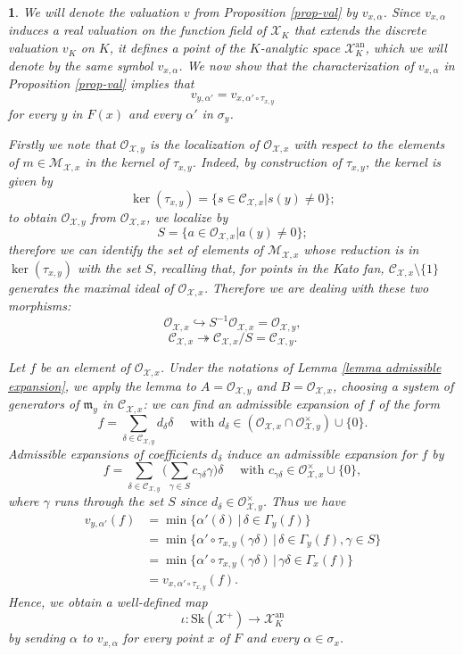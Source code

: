 \documentclass{amsart}%
\numberwithin{equation}{subsection}
\theoremstyle{plain2}
\theoremstyle{definition2}
\theoremstyle{stepstyle}
\theoremstyle{point}
\theoremstyle{subpoint}
\newtheorem{subpoint}[equation]{}%
\newcommand{\spa}[1]{\begin{subpoint}#1\end{subpoint}}           %
\newcommand{\cX}{\ensuremath{\mathscr{X}}}
\newcommand{\caM}{\ensuremath{\mathcal{M}}}
\newcommand{\caC}{\ensuremath{\mathcal{C}}}
\newcommand{\caO}{\ensuremath{\mathcal{O}}}
\newcommand{\an}{\mathrm{an}}
\newcommand{\Sk}{\mathrm{Sk}}
\begin{document}
\spa{ We will denote the valuation $v$ from Proposition
\ref{prop-val} by $v_{x,\alpha}$. Since $v_{x,\alpha}$ induces a real valuation on the function field of $\cX_K$ that extends the discrete valuation $v_K$ on $K$, it defines a point of the $K$-analytic space $\cX_K^\an$, which we will denote by the same symbol $v_{x,\alpha}$. We now show that the characterization of $v_{x,\alpha}$ in Proposition \ref{prop-val} implies that $$v_{y,\alpha'}=v_{x,\alpha'\circ \tau_{x,y}}$$ for every $y$ in $F(x)$ and every $\alpha'$ in $\sigma_y$.

Firstly we note that  $\mathcal{O}_{\cX,y}$ is the localization of $\mathcal{O}_{\cX,x}$ with respect to the elements of $m\in \mathcal{M}_{\cX,x}$ in the kernel of $\tau_{x,y}$.
Indeed, by construction of $\tau_{x,y}$, the kernel is given by $$\ker (\tau_{x,y})= \{s \in \caC_{\cX,x} | s(y) \neq 0 \};$$ to obtain $\mathcal{O}_{\cX,y}$ from $\mathcal{O}_{\cX,x}$, we localize  by $$S=\{a \in \mathcal{O}_{\cX,x} | a(y) \neq 0 \};$$ therefore we can identify the set of elements of $\caM_{\cX,x}$ whose reduction is in $\ker(\tau_{x,y})$ with the set $S$, recalling that, for points in the Kato fan, $\mathcal{C}_{\cX,x}\setminus \{1\}$ generates the maximal ideal of $\mathcal{O}_{\cX,x}$. Therefore we are dealing with these two morphisms:
$$\caO_{\cX,x} \hookrightarrow S^{-1}\caO_{\cX,x}=\caO_{\cX,y},$$
$$ \caC_{\cX,x} \twoheadrightarrow \caC_{\cX,x}/S = \caC_{\cX,y}.$$

Let $f$ be an element of $ \caO_{\cX,x}$. Under the notations of Lemma \ref{lemma admissible expansion}, we apply the lemma to $A= \caO_{\cX,y}$ and $B=\caO_{\cX,x}$, choosing a system of generators of $\mathfrak{m}_y$ in $\caC_{\cX,x}$: we can find an admissible expansion of $f$ of the form $$f=\sum_{\delta \in \mathcal{C}_{\cX,y}}d_{\delta}\delta \quad \text{ with }d_\delta \in (\caO_{\cX,x} \cap \caO_{\cX,y}^\times) \cup \{0\}.$$ Admissible expansions of coefficients $d_\delta$ induce an admissible expansion for $f$ by $$f=\sum_{\delta \in \mathcal{C}_{\cX,y}}\big( \sum_{\gamma \in S} c_{\gamma \delta} \gamma \big)\delta \quad \text{ with }c_{\gamma \delta} \in \caO_{\cX,x}^\times \cup \{0\},$$ where $\gamma$ runs through the set $S$ since $d_\delta \in \caO_{\cX,y}^\times$. Thus we have \begin{align*}
v_{y,\alpha'}(f) &= \min\{\alpha'(\delta)\,|\,\delta\in \Gamma_y(f)\}\\
& = \min\{\alpha' \circ \tau_{x,y}( \gamma \delta)\,|\,\delta\in \Gamma_y(f), \gamma \in S\}\\
& = \min\{\alpha' \circ \tau_{x,y}( \gamma \delta)\,|\,\gamma\delta\in \Gamma_x(f)\}\\
& = v_{x,\alpha' \circ \tau_{x,y}}(f).
\end{align*}
Hence, we obtain a well-defined map $$\iota:\Sk(\cX^+)\to \cX_K^\an$$ by sending $\alpha$ to $v_{x,\alpha}$ for every point $x$ of $F$ and every $\alpha\in \sigma_x$.}
\end{document}

